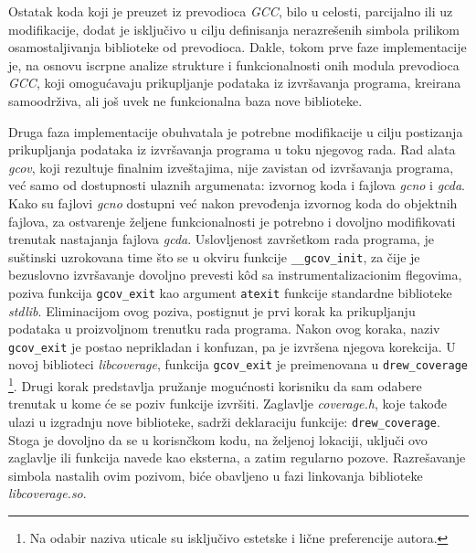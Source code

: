 \documentclass[12pt,oneside]{memoir}
\newcommand{\kod}[1]{\texttt{#1}}
\newcommand{\strano}[1]{\textit{#1}}
\begin{document}
Ostatak koda koji je preuzet iz prevodioca \strano{GCC}, bilo u celosti, parcijalno ili uz modifikacije, dodat je isključivo u cilju definisanja nerazrešenih simbola prilikom osamostaljivanja biblioteke od prevodioca. Dakle, tokom prve faze implementacije je, na osnovu iscrpne analize strukture i funkcionalnosti onih modula prevodioca \strano{GCC}, koji omogućavaju prikupljanje podataka iz izvršavanja programa, kreirana samoodrživa, ali još uvek ne funkcionalna baza nove biblioteke. 

Druga faza implementacije obuhvatala je potrebne modifikacije u cilju postizanja prikupljanja podataka iz izvršavanja programa u toku njegovog rada. Rad alata \strano{gcov}, koji rezultuje finalnim izveštajima, nije zavistan od izvršavanja programa, već samo od dostupnosti ulaznih argumenata: izvornog koda i fajlova \strano{gcno} i \strano{gcda}. Kako su fajlovi \strano{gcno} dostupni već nakon prevođenja izvornog koda do objektnih fajlova, za ostvarenje željene funkcionalnosti je potrebno i dovoljno modifikovati trenutak nastajanja fajlova \strano{gcda}. Uslovljenost završetkom rada programa, je suštinski uzrokovana time što se u okviru funkcije \kod{\_\_gcov\_init}, za čije je bezuslovno izvršavanje dovoljno prevesti k\^{o}d sa instrumentalizacionim flegovima, poziva funkcija \kod{gcov\_exit} kao argument \kod{atexit} funkcije standardne biblioteke \strano{stdlib}. Eliminacijom ovog poziva, postignut je prvi korak ka prikupljanju podataka u proizvoljnom trenutku rada programa. Nakon ovog koraka, naziv \kod{gcov\_exit} je postao neprikladan i konfuzan, pa je izvršena njegova korekcija. U novoj biblioteci \strano{libcoverage}, funkcija \kod{gcov\_exit} je preimenovana u \kod{drew\_coverage} \footnote{Na odabir naziva uticale su isključivo estetske i lične preferencije autora.}. Drugi korak predstavlja pružanje mogućnosti korisniku da sam odabere trenutak u kome će se poziv funkcije izvršiti. Zaglavlje \strano{coverage.h}, koje takođe ulazi u izgradnju nove biblioteke, sadrži deklaraciju funkcije: \kod{drew\_coverage}. Stoga je dovoljno da se u korisnčkom kodu, na željenoj lokaciji, uključi ovo zaglavlje ili funkcija navede kao eksterna, a zatim regularno pozove. Razrešavanje simbola nastalih ovim pozivom, biće obavljeno u fazi linkovanja biblioteke \strano{libcoverage.so}.
\end{document}
